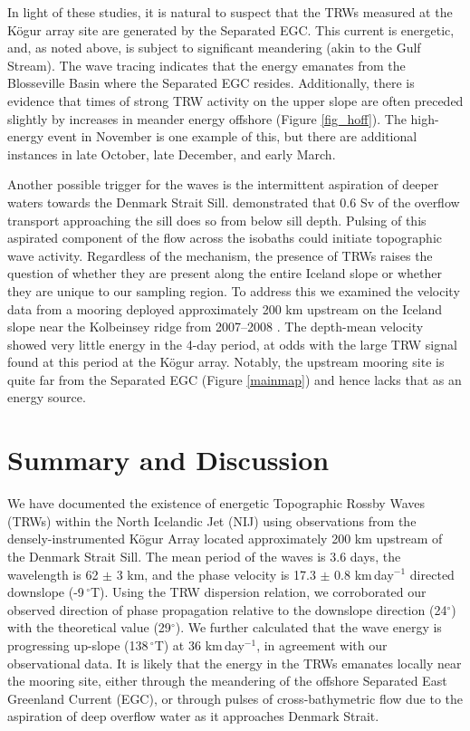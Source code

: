 \documentclass[12pt,titlepage,figuresatend]{article}
\begin{document}
In light of these studies, it is natural to suspect that the TRWs measured at the K\"{o}gur array site are generated by the Separated EGC. This current is energetic, and, as noted above, is subject to significant meandering (akin to the Gulf Stream). The wave tracing indicates that the energy emanates from the Blosseville Basin where the Separated EGC resides. Additionally, there is evidence that times of strong TRW activity on the upper slope are often preceded slightly by increases in meander energy offshore (Figure \ref{fig_hoff}). The high-energy event in November is one example of this, but there are additional instances in late October, late December, and early March. 

Another possible trigger for the waves is the intermittent aspiration of deeper waters towards the Denmark Strait Sill. \cite{Harden2016} demonstrated that 0.6 Sv of the overflow transport approaching the sill does so from below sill depth. Pulsing of this aspirated component of the flow across the isobaths could initiate topographic wave activity. Regardless of the mechanism, the presence of TRWs raises the question of whether they are present along the entire Iceland slope or whether they are unique to our sampling region. To address this we examined the velocity data from a mooring deployed approximately 200 km upstream on the Iceland slope near the Kolbeinsey ridge from 2007--2008 \cite[]{Jonsson2012}. The depth-mean velocity showed very little energy in the 4-day period, at odds with the large TRW signal found at this period at the K\"{o}gur array. Notably, the upstream mooring site is quite far from the Separated EGC (Figure \ref{mainmap}) and hence lacks that as an energy source. 


\section{Summary and Discussion}

We have documented the existence of energetic Topographic Rossby Waves (TRWs) within the North Icelandic Jet (NIJ) using observations from the densely-instrumented K\"{o}gur Array located approximately 200 km upstream of the Denmark Strait Sill. The mean period of the waves is 3.6 days, the wavelength is 62 $\pm$ 3 km, and the phase velocity is 17.3 $\pm$ 0.8 km$\,$day$^{-1}$ directed downslope (-9$\,^{\circ}$T). Using the TRW dispersion relation, we corroborated our observed direction of phase propagation relative to the downslope direction (24$^{\circ}$) with the theoretical value (29$^{\circ}$). We further calculated that the wave energy is progressing up-slope (138$\,^{\circ}$T) at 36 km$\,$day$^{-1}$, in agreement with our observational data. It is likely that the energy in the TRWs emanates locally near the mooring site, either through the meandering of the offshore Separated East Greenland Current (EGC), or through pulses of cross-bathymetric flow due to the aspiration of deep overflow water as it approaches Denmark Strait. 
\end{document}
